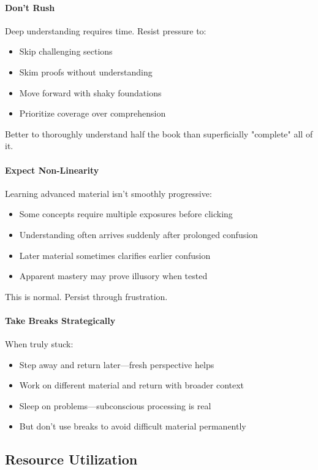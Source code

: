 \paragraph{Don't Rush}
Deep understanding requires time. Resist pressure to:
\begin{itemize}
    \item Skip challenging sections
    \item Skim proofs without understanding
    \item Move forward with shaky foundations
    \item Prioritize coverage over comprehension
\end{itemize}

Better to thoroughly understand half the book than superficially "complete" all of it.

\paragraph{Expect Non-Linearity}
Learning advanced material isn't smoothly progressive:
\begin{itemize}
    \item Some concepts require multiple exposures before clicking
    \item Understanding often arrives suddenly after prolonged confusion
    \item Later material sometimes clarifies earlier confusion
    \item Apparent mastery may prove illusory when tested
\end{itemize}

This is normal. Persist through frustration.

\paragraph{Take Breaks Strategically}
When truly stuck:
\begin{itemize}
    \item Step away and return later—fresh perspective helps
    \item Work on different material and return with broader context
    \item Sleep on problems—subconscious processing is real
    \item But don't use breaks to avoid difficult material permanently
\end{itemize}

\subsection{Resource Utilization}

